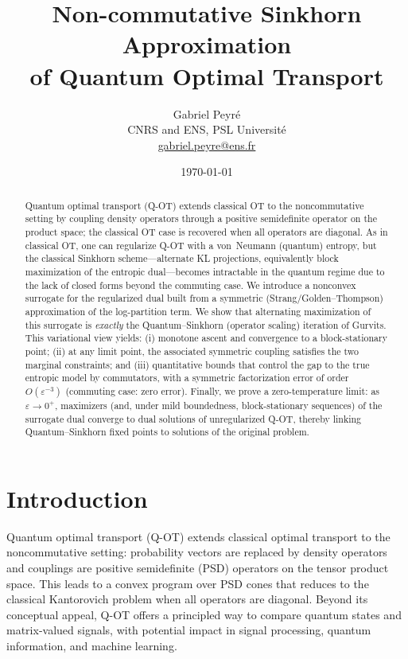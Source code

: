 \documentclass[10pt]{article}
\title{Non-commutative Sinkhorn Approximation \\ of Quantum Optimal Transport}
\author{Gabriel Peyr\'e\\CNRS and ENS, PSL Universit\'e\\\url{gabriel.peyre@ens.fr}}
\date{\today}
\renewcommand{\epsilon}{\varepsilon}
\theoremstyle{plain}
\theoremstyle{definition}
\theoremstyle{remark}
\begin{document}
\maketitle

\begin{abstract}
Quantum optimal transport (Q-OT) extends classical OT to the noncommutative setting by coupling density operators through a positive semidefinite operator on the product space; the classical OT case is recovered when all operators are diagonal. As in classical OT, one can regularize Q-OT with a von~Neumann (quantum) entropy, but the classical Sinkhorn scheme—alternate KL projections, equivalently block maximization of the entropic dual—becomes intractable in the quantum regime due to the lack of closed forms beyond the commuting case.
%
We introduce a nonconvex surrogate for the regularized dual built from a symmetric (Strang/Golden--Thompson) approximation of the log-partition term. We show that alternating maximization of this surrogate is \emph{exactly} the Quantum–Sinkhorn (operator scaling) iteration of Gurvits. This variational view yields: (i) monotone ascent and convergence to a block-stationary point; (ii) at any limit point, the associated symmetric coupling satisfies the two marginal constraints; and (iii) quantitative bounds that control the gap to the true entropic model by commutators, with a symmetric factorization error of order $O(\epsilon^{-3})$ (commuting case: zero error). Finally, we prove a zero-temperature limit: as $\epsilon\to 0^+$, maximizers (and, under mild boundedness, block-stationary sequences) of the surrogate dual converge to dual solutions of unregularized Q-OT, thereby linking Quantum–Sinkhorn fixed points to solutions of the original problem.
\end{abstract}
\section{Introduction}

Quantum optimal transport (Q-OT) extends classical optimal transport to the noncommutative setting: probability vectors are replaced by density operators and couplings are positive semidefinite (PSD) operators on the tensor product space. This leads to a convex program over PSD cones that reduces to the classical Kantorovich problem when all operators are diagonal. Beyond its conceptual appeal, Q-OT offers a principled way to compare quantum states and matrix-valued signals, with potential impact in signal processing, quantum information, and machine learning.
\end{document}
